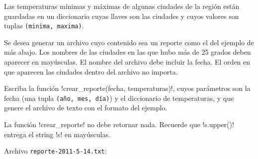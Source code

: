 Las temperaturas mínimas y máximas
de algunas ciudades de la región
están guardadas en un diccionario
cuyas llaves son las ciudades
y cuyos valores son tuplas \texttt{(minima, maxima)}.

Se desea generar un archivo
cuyo contenido sea un reporte como el del ejemplo de más abajo.
Los nombres de las ciudades en las que hubo más de 25 grados
deben aparecer en mayúsculas.
El nombre del archivo debe incluir la fecha.
El orden en que aparecen las ciudades
dentro del archivo no importa.

Escriba la función \li!crear_reporte(fecha, temperaturas)!,
cuyos parámetros son
la fecha (una tupla \texttt{(año, mes, día)})
y el diccionario de temperaturas,
y que genere el archivo de texto
con el formato del ejemplo.

La función \li!crear_reporte! no debe retornar nada.
Recuerde que \li!s.upper()!
entrega el string \li!s! en mayúsculas.

\begin{minipage}[T]{.45\textwidth}
  
\end{minipage}
\hfill
\begin{minipage}[T]{.41\textwidth}
  Archivo \texttt{reporte-2011-5-14.txt}:
  
\end{minipage}

